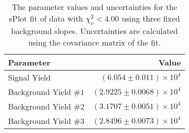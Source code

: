 
\begin{table}[ht]
    \begin{center}
        \begin{tabular}{lr}\toprule
            Parameter & Value \\\midrule
            Signal Yield & $(6.054 \pm 0.011) \times 10^{4}$ \\
            Background Yield $\#1$ & $(2.9225 \pm 0.0068) \times 10^{4}$ \\
            Background Yield $\#2$ & $(3.1707 \pm 0.0051) \times 10^{4}$ \\
            Background Yield $\#3$ & $(2.8496 \pm 0.0073) \times 10^{4}$ \\\bottomrule
        \end{tabular}
        \caption{The parameter values and uncertainties for the sPlot fit of data with $\chi^2_\nu < 4.00$ using three fixed background slopes. Uncertainties are calculated using the covariance matrix of the fit.}\label{tab:splot-fit-results-chisqdof-4.00-fixed-3}
    \end{center}
\end{table}
